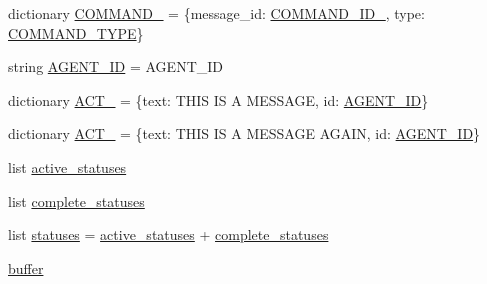\begin{DoxyCompactItemize}
\item 
dictionary \hyperlink{namespaceparlai_1_1mturk_1_1core_1_1legacy__2018_1_1test_1_1test__mturk__agent_a58a31eefb69f1f47c072564b4f3ae479}{C\+O\+M\+M\+A\+N\+D\+\_} = \{\textquotesingle{}message\+\_\+id\textquotesingle{}\+: \hyperlink{namespaceparlai_1_1mturk_1_1core_1_1legacy__2018_1_1test_1_1test__mturk__agent_a919b0c2ea46c6da516f0de5ede1a2838}{C\+O\+M\+M\+A\+N\+D\+\_\+\+I\+D\+\_}, \textquotesingle{}type\textquotesingle{}\+: \hyperlink{namespaceparlai_1_1mturk_1_1core_1_1legacy__2018_1_1test_1_1test__mturk__agent_aa73eb7ed2c9fc89d32d1412f9e72eb29}{C\+O\+M\+M\+A\+N\+D\+\_\+\+T\+Y\+PE}\}
\item 
string \hyperlink{namespaceparlai_1_1mturk_1_1core_1_1legacy__2018_1_1test_1_1test__mturk__agent_ac7fab33b236465839b4038fdd437318c}{A\+G\+E\+N\+T\+\_\+\+ID} = \textquotesingle{}A\+G\+E\+N\+T\+\_\+\+ID\textquotesingle{}
\item 
dictionary \hyperlink{namespaceparlai_1_1mturk_1_1core_1_1legacy__2018_1_1test_1_1test__mturk__agent_ad7d7e101657ccd2bc7fd0cf7f89abf2a}{A\+C\+T\+\_} = \{\textquotesingle{}text\textquotesingle{}\+: \textquotesingle{}T\+H\+IS IS A M\+E\+S\+S\+A\+GE\textquotesingle{}, \textquotesingle{}id\textquotesingle{}\+: \hyperlink{namespaceparlai_1_1mturk_1_1core_1_1legacy__2018_1_1test_1_1test__mturk__agent_ac7fab33b236465839b4038fdd437318c}{A\+G\+E\+N\+T\+\_\+\+ID}\}
\item 
dictionary \hyperlink{namespaceparlai_1_1mturk_1_1core_1_1legacy__2018_1_1test_1_1test__mturk__agent_aa3b362a45656f51bb3395a0406e54ddf}{A\+C\+T\+\_} = \{\textquotesingle{}text\textquotesingle{}\+: \textquotesingle{}T\+H\+IS IS A M\+E\+S\+S\+A\+GE A\+G\+A\+IN\textquotesingle{}, \textquotesingle{}id\textquotesingle{}\+: \hyperlink{namespaceparlai_1_1mturk_1_1core_1_1legacy__2018_1_1test_1_1test__mturk__agent_ac7fab33b236465839b4038fdd437318c}{A\+G\+E\+N\+T\+\_\+\+ID}\}
\item 
list \hyperlink{namespaceparlai_1_1mturk_1_1core_1_1legacy__2018_1_1test_1_1test__mturk__agent_a907ace87a2922b25a89023aeccc185d9}{active\+\_\+statuses}
\item 
list \hyperlink{namespaceparlai_1_1mturk_1_1core_1_1legacy__2018_1_1test_1_1test__mturk__agent_a740bc47689b85ca43338a3cdf2ad4ff3}{complete\+\_\+statuses}
\item 
list \hyperlink{namespaceparlai_1_1mturk_1_1core_1_1legacy__2018_1_1test_1_1test__mturk__agent_a7598f753f13b8a6e4b1bcf8d450e8c1c}{statuses} = \hyperlink{namespaceparlai_1_1mturk_1_1core_1_1legacy__2018_1_1test_1_1test__mturk__agent_a907ace87a2922b25a89023aeccc185d9}{active\+\_\+statuses} + \hyperlink{namespaceparlai_1_1mturk_1_1core_1_1legacy__2018_1_1test_1_1test__mturk__agent_a740bc47689b85ca43338a3cdf2ad4ff3}{complete\+\_\+statuses}
\item 
\hyperlink{namespaceparlai_1_1mturk_1_1core_1_1legacy__2018_1_1test_1_1test__mturk__agent_ac6d07089de2727fcd7a450f02872270c}{buffer}
\end{DoxyCompactItemize}


